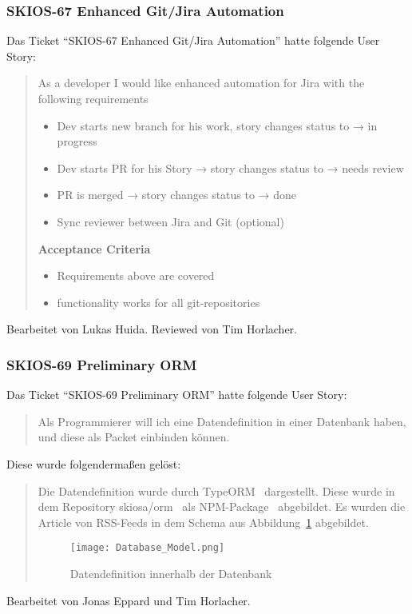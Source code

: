 \subsubsection{SKIOS-67 Enhanced Git/Jira Automation}
Das Ticket \enquote{SKIOS-67 Enhanced Git/Jira Automation} hatte folgende User Story:
\begin{quotation}
    As a developer I would like enhanced automation for Jira with the following requirements
    \begin{itemize}
        \item Dev starts new branch for his work, story changes status to → in progress
        \item Dev starts PR for his Story → story changes status to → needs review
        \item PR is merged → story changes status to → done
        \item Sync reviewer between Jira and Git (optional) 
    \end{itemize}

    \textbf{Acceptance Criteria}
    \begin{itemize}
        \item Requirements above are covered
        \item functionality works for all git-repositories
    \end{itemize}
\end{quotation}
Bearbeitet von Lukas Huida.
Reviewed von Tim Horlacher.

\subsubsection{SKIOS-69 Preliminary ORM}
Das Ticket \enquote{SKIOS-69 Preliminary ORM} hatte folgende User Story:
\begin{quotation}
    Als Programmierer will ich eine Datendefinition in einer Datenbank
    haben, und diese als Packet einbinden können.
\end{quotation}
Diese wurde folgendermaßen gelöst:
\begin{quotation}
Die Datendefinition wurde durch TypeORM~\parencite{web/TypeORM} dargestellt.
Diese wurde in dem Repository skiosa/orm~\parencite{git/skiosa/orm} als NPM-Package~\parencite{web/npm} abgebildet.
Es wurden die Article von RSS-Feeds in dem Schema aus Abbildung~\ref{fig:databaseORM} abgebildet.
\begin{figure}
    \texttt{[image: Database\_Model.png]}
    \caption{Datendefinition innerhalb der Datenbank}
    \label{fig:databaseORM}
\end{figure}
\end{quotation}
Bearbeitet von Jonas Eppard und Tim Horlacher.

